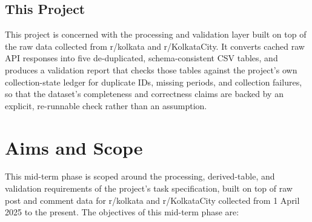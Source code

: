 \documentclass[12pt]{article}
\begin{document}
\subsection{This Project}
This project is concerned with the processing and validation layer built on top of the raw data
collected from r/kolkata and r/KolkataCity. It converts cached raw API responses into five
de-duplicated, schema-consistent CSV tables, and produces a validation report that checks those
tables against the project's own collection-state ledger for duplicate IDs, missing periods, and
collection failures, so that the dataset's completeness and correctness claims are backed by an
explicit, re-runnable check rather than an assumption.

\section{Aims and Scope}

This mid-term phase is scoped around the processing, derived-table, and validation requirements
of the project's task specification, built on top of raw post and comment data for r/kolkata and
r/KolkataCity collected from 1 April 2025 to the present. The objectives of this mid-term phase
are:
\end{document}
